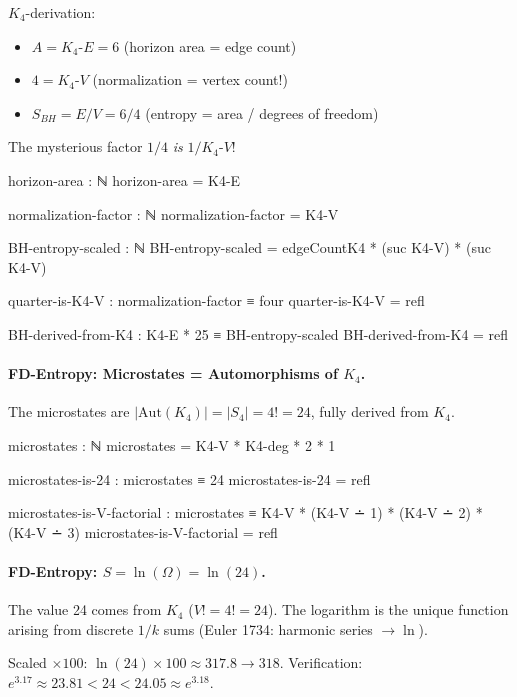 \documentclass[11pt,a4paper]{book}
\begin{document}
$K_4$-derivation:
\begin{itemize}
  \item $A = K_4\text{-}E = 6$ (horizon area = edge count)
  \item $4 = K_4\text{-}V$ (normalization = vertex count!)
  \item $S_{BH} = E/V = 6/4$ (entropy = area / degrees of freedom)
\end{itemize}
The mysterious factor $1/4$ \emph{is} $1/K_4\text{-}V$!

\begin{code}
  horizon-area : ℕ
  horizon-area = K4-E

  normalization-factor : ℕ
  normalization-factor = K4-V

  BH-entropy-scaled : ℕ
  BH-entropy-scaled = edgeCountK4 * (suc K4-V) * (suc K4-V)

  quarter-is-K4-V : normalization-factor ≡ four
  quarter-is-K4-V = refl

  BH-derived-from-K4 : K4-E * 25 ≡ BH-entropy-scaled
  BH-derived-from-K4 = refl

\end{code}

\paragraph{FD-Entropy: Microstates = Automorphisms of $K_4$.}
The microstates are $|\mathrm{Aut}(K_4)| = |S_4| = 4! = 24$, fully derived from $K_4$.

\begin{code}
  microstates : ℕ
  microstates = K4-V * K4-deg * 2 * 1

  microstates-is-24 : microstates ≡ 24
  microstates-is-24 = refl

  microstates-is-V-factorial : microstates ≡ K4-V * (K4-V ∸ 1) * (K4-V ∸ 2) * (K4-V ∸ 3)
  microstates-is-V-factorial = refl

\end{code}

\paragraph{FD-Entropy: $S = \ln(\Omega) = \ln(24)$.}
The value 24 comes from $K_4$ ($V! = 4! = 24$). The logarithm is the unique function 
arising from discrete $1/k$ sums (Euler 1734: harmonic series $\to \ln$).

Scaled $\times 100$: $\ln(24) \times 100 \approx 317.8 \to 318$.
Verification: $e^{3.17} \approx 23.81 < 24 < 24.05 \approx e^{3.18}$.
\end{document}
